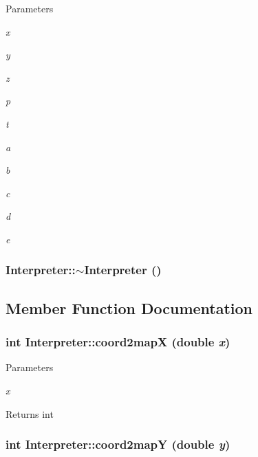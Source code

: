 \begin{DoxyParams}{Parameters}
\item[{\em x}]\item[{\em y}]\item[{\em z}]\item[{\em p}]\item[{\em t}]\item[{\em a}]\item[{\em b}]\item[{\em c}]\item[{\em d}]\item[{\em e}]\end{DoxyParams}
\hypertarget{classInterpreter_a0f96b57f8126e2b5bc63390121e4b5b1}{
\subsubsection[{$\sim$Interpreter}]{\setlength{\rightskip}{0pt plus 5cm}Interpreter::$\sim$Interpreter ()}}
\label{classInterpreter_a0f96b57f8126e2b5bc63390121e4b5b1}


\subsection{Member Function Documentation}
\hypertarget{classInterpreter_a36e1b3f28a3d8dae2155f1f0212bed7d}{
\subsubsection[{coord2mapX}]{\setlength{\rightskip}{0pt plus 5cm}int Interpreter::coord2mapX (double {\em x})}}
\label{classInterpreter_a36e1b3f28a3d8dae2155f1f0212bed7d}

\begin{DoxyParams}{Parameters}
\item[{\em x}]\end{DoxyParams}
\begin{DoxyReturn}{Returns}
int 
\end{DoxyReturn}
\hypertarget{classInterpreter_a5b597351a6bdaf23fbf42aed910b151f}{
\subsubsection[{coord2mapY}]{\setlength{\rightskip}{0pt plus 5cm}int Interpreter::coord2mapY (double {\em y})}}
\label{classInterpreter_a5b597351a6bdaf23fbf42aed910b151f}

